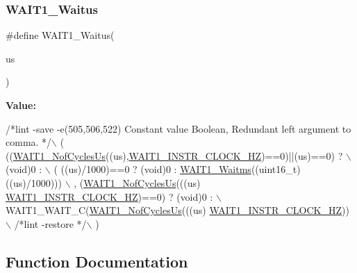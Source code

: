 \mbox{\label{group___w_a_i_t1__module_ga3bad7338e555cbbbaa870ee3fe2db0f6}} 
\subsubsection{\texorpdfstring{W\+A\+I\+T1\+\_\+\+Waitus}{WAIT1\_Waitus}}
{\footnotesize\ttfamily \#define W\+A\+I\+T1\+\_\+\+Waitus(\begin{DoxyParamCaption}\item[{}]{us }\end{DoxyParamCaption})}

{\bfseries Value\+:}
\begin{DoxyCode}
\textcolor{comment}{/*lint -save -e(505,506,522) Constant value Boolean, Redundant left argument to comma. */}\(\backslash\)
       (  ((\hyperlink{group___w_a_i_t1__module_ga7dabbdd9744304c62df945607fa13dcf}{WAIT1\_NofCyclesUs}((us),\hyperlink{group___w_a_i_t1__module_gad719b8589ad1bf92a03ec94ce95c4804}{WAIT1\_INSTR\_CLOCK\_HZ})==0)||(us)==0)
       ? \(\backslash\)
          (\textcolor{keywordtype}{void})0 : \(\backslash\)
          ( ((us)/1000)==0 ? (void)0 : \hyperlink{group___w_a_i_t1__module_ga04b03075f856862ff2bc4ff69825aeb6}{WAIT1\_Waitms}((uint16\_t)((us)/1000))) \(\backslash\)
          , (\hyperlink{group___w_a_i_t1__module_ga7dabbdd9744304c62df945607fa13dcf}{WAIT1\_NofCyclesUs}(((us)%
      \hyperlink{group___w_a_i_t1__module_gad719b8589ad1bf92a03ec94ce95c4804}{WAIT1\_INSTR\_CLOCK\_HZ})==0) ? (\textcolor{keywordtype}{void})0 : \(\backslash\)
            WAIT1\_WAIT\_C(\hyperlink{group___w_a_i_t1__module_ga7dabbdd9744304c62df945607fa13dcf}{WAIT1\_NofCyclesUs}(((us)%
      \hyperlink{group___w_a_i_t1__module_gad719b8589ad1bf92a03ec94ce95c4804}{WAIT1\_INSTR\_CLOCK\_HZ})) \(\backslash\)
       \textcolor{comment}{/*lint -restore */}\(\backslash\)
       )
\end{DoxyCode}


\subsection{Function Documentation}
\mbox{\label{group___w_a_i_t1__module_ga0d401ca6ca297b5b7a450deed0c42b78}} 
